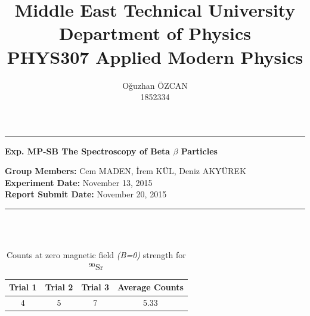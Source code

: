 \documentclass[a4paper,12pt]{article}
\title{Middle East Technical University\\Department of Physics\\\textbf{PHYS307 Applied Modern Physics}}
\author{Oğuzhan ÖZCAN\\1852334}
\date{}
\providecommand{\groupmember}[1]{\textbf{Group Members:} }
\providecommand{\expdate}[1]{\textbf{Experiment Date:} }
\providecommand{\repdate}[1]{\textbf{Report Submit Date:} }
\providecommand{\expname}[1]{\textbf{Exp. MP-SB The Spectroscopy of Beta $\beta$ Particles} }
\begin{document}
\maketitle

\thispagestyle{fancy}

\noindent\rule{18.4cm}{0.8pt}
\begin{center}
	\expname{arg1}{}
\end{center}
\groupmember{arg1}{Cem MADEN, İrem KÜL, Deniz AKYÜREK}\\
\expdate{arg1}{November 13, 2015}\\
\repdate{arg1}{November 20, 2015}\\
\noindent\rule{18.4cm}{0.8pt}\\\\
\begin{table}[h!]
	
	\begin{center}
		\begin{tabular}{|c|c|c|c|}
			\hline \textbf{Trial 1} & \textbf{Trial 2}  & \textbf{Trial 3}  & A\textbf{verage Counts} \\ 
			\hline 4 & 5 & 7 & 5.33 \\ 
			\hline 
		\end{tabular}
		\caption{Counts at zero magnetic field \textit{(B=0)} strength for $^{90}$Sr}
	\end{center} 
\end{table}
\end{document}
